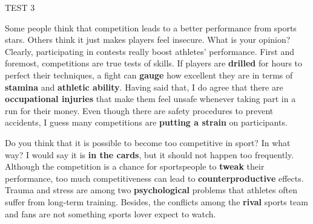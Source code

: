 \begin{glossarymc}[Cambridge 7]
\begin{test}{TEST 3}
    \begin{qa}{Some people think that competition leads to a better performance from sports stars. Others think it just makes players feel insecure. What is your opinion?}
    Clearly, participating in contests really boost athletes’ performance. First and foremost, competitions are true tests of skills. If players are \textbf{drilled} for hours to perfect their techniques, a fight can \textbf{gauge} how excellent they are in terms of \textbf{stamina} and \textbf{athletic ability}. Having said that, I do agree that there are \textbf{occupational injuries} that make them feel unsafe whenever taking part in a run for their money. Even though there are safety procedures to prevent accidents, I guess many competitions are \textbf{putting a strain} on participants.
    \end{qa}

    \begin{qa}{Do you think that it is possible to become too competitive in sport? In what way?}
    I would say it is \textbf{in the cards}, but it should not happen too frequently. Although the competition is a chance for sportspeople to \textbf{tweak} their performance, too much competitiveness can lead to \textbf{counterproductive} effects. Trauma and stress are among two \textbf{psychological} problems that athletes often suffer from long-term training. Besides, the conflicts among the \textbf{rival} sports team and fans are not something sports lover expect to watch.
    \end{qa}


\end{test}
\end{glossarymc}
